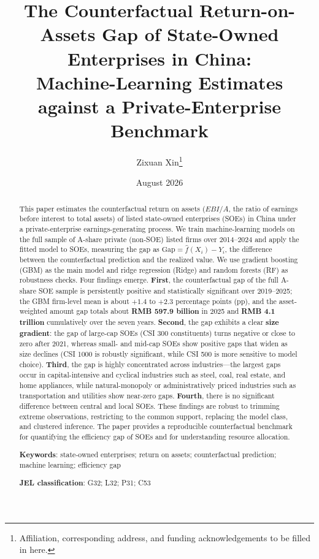 \documentclass[11pt,a4paper]{article}
\title{\bfseries The Counterfactual Return-on-Assets Gap of State-Owned Enterprises in China:\\ Machine-Learning Estimates against a Private-Enterprise Benchmark}
\author{Zixuan Xin\thanks{Affiliation, corresponding address, and funding acknowledgements to be filled in here.}}
\date{August 2026}
\begin{document}
\maketitle

\begin{abstract}
\noindent This paper estimates the counterfactual return on assets ($EBI/A$, the ratio of earnings before interest to total assets) of listed state-owned enterprises (SOEs) in China under a private-enterprise earnings-generating process. We train machine-learning models on the full sample of A-share private (non-SOE) listed firms over 2014--2024 and apply the fitted model to SOEs, measuring the gap as $\text{Gap}=\hat f(X_i)-Y_i$, the difference between the counterfactual prediction and the realized value. We use gradient boosting (GBM) as the main model and ridge regression (Ridge) and random forests (RF) as robustness checks. Four findings emerge. \textbf{First}, the counterfactual gap of the full A-share SOE sample is persistently positive and statistically significant over 2019--2025; the GBM firm-level mean is about $+1.4$ to $+2.3$ percentage points (pp), and the asset-weighted amount gap totals about \textbf{RMB 597.9 billion} in 2025 and \textbf{RMB 4.1 trillion} cumulatively over the seven years. \textbf{Second}, the gap exhibits a clear \textbf{size gradient}: the gap of large-cap SOEs (CSI 300 constituents) turns negative or close to zero after 2021, whereas small- and mid-cap SOEs show positive gaps that widen as size declines (CSI 1000 is robustly significant, while CSI 500 is more sensitive to model choice). \textbf{Third}, the gap is highly concentrated across industries---the largest gaps occur in capital-intensive and cyclical industries such as steel, coal, real estate, and home appliances, while natural-monopoly or administratively priced industries such as transportation and utilities show near-zero gaps. \textbf{Fourth}, there is no significant difference between central and local SOEs. These findings are robust to trimming extreme observations, restricting to the common support, replacing the model class, and clustered inference. The paper provides a reproducible counterfactual benchmark for quantifying the efficiency gap of SOEs and for understanding resource allocation.

\medskip
\noindent\textbf{Keywords}: state-owned enterprises; return on assets; counterfactual prediction; machine learning; efficiency gap

\noindent\textbf{JEL classification}: G32; L32; P31; C53
\end{abstract}
\end{document}
